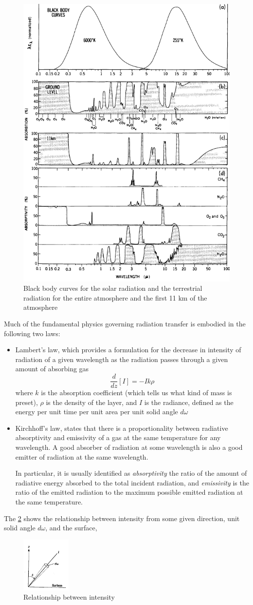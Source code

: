 \begin{figure}[htp!]
    \centering
    \includegraphics[width=0.4\linewidth]{uploads/image11.png}
    \caption{Black body curves for the solar radiation and the terrestrial radiation for the entire atmosphere and the first 11 km of the atmosphere}
    \label{fig:enter-label}
\end{figure}
Much of the fundamental physics governing radiation transfer is embodied in the following two laws:
\begin{itemize}
    \item Lambert's law, which provides a formulation for the decrease in intensity of radiation of a given wavelength as the radiation passes through a given amount of absorbing gas
    $$\frac{d}{dz}[I]=-Ik\rho$$
    where $k$ is the absorption coefficient (which tells us what kind of mass is preset), $\rho$ is the density of the layer, and $I$ is the radiance, defined as the energy per unit time per  unit area per unit solid angle $d\omega$

    \item Kirchhoff's law, states that there is a proportionality between radiative absorptivity and emissivity of a gas at the same temperature for any wavelength. A good absorber of radiation at some wavelength is also a good emitter of radiation at the same wavelength.

    In particular, it is usually identified as \textit{absorptivity} the ratio of the amount of radiative energy absorbed to the total incident radiation, and \textit{emissivity} is the ratio of the emitted radiation to the maximum possible emitted radiation at the same temperature.
\end{itemize}


The \ref{fig:relat} shows the relationship between intensity from some given direction, unit solid angle $d\omega$, and the surface,
\begin{figure}
    \begin{center}
        \includegraphics[width=0.22\textwidth]{uploads/imageIw.png}
    \end{center}
    \caption{Relationship between intensity}
    \label{fig:relat}
\end{figure}

